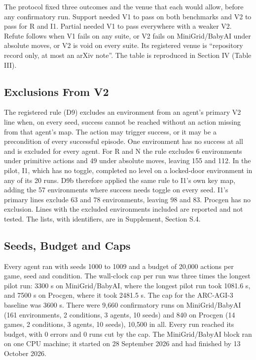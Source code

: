 \documentclass[journal]{IEEEtran}
\begin{document}
The protocol fixed three outcomes and the venue that each would allow,
before any confirmatory run. Support needed V1 to pass on both
benchmarks and V2 to pass for R and I1. Partial needed V1 to pass
everywhere with a weaker V2. Refute follows when V1 fails on any suite,
or V2 fails on MiniGrid/BabyAI under absolute moves, or V2 is void on
every suite. Its registered venue is ``repository record only, at most
an arXiv note''. The table is reproduced in Section IV (Table III).

\subsection{Exclusions From V2}\label{exclusions-from-v2}

The registered rule (D9) excludes an environment from an agent's primary
V2 line when, on every seed, success cannot be reached without an action
missing from that agent's map. The action may trigger success, or it may
be a precondition of every successful episode. One environment has no
success at all and is excluded for every agent. For R and N the rule
excludes 6 environments under primitive actions and 49 under absolute
moves, leaving 155 and 112. In the pilot, I1, which has no toggle,
completed no level on a locked-door environment in any of its 20 runs.
D9b therefore applied the same rule to I1's own key map, adding the 57
environments where success needs toggle on every seed. I1's primary
lines exclude 63 and 78 environments, leaving 98 and 83. Procgen has no
exclusion. Lines with the excluded environments included are reported
and not tested. The lists, with identifiers, are in Supplement, Section
S.4.

\subsection{Seeds, Budget and Caps}\label{seeds-budget-and-caps}

Every agent ran with seeds 1000 to 1009 and a budget of 20,000 actions
per game, seed and condition. The wall-clock cap per run was three times
the longest pilot run: 3300 s on MiniGrid/BabyAI, where the longest
pilot run took 1081.6 s, and 7500 s on Procgen, where it took 2481.5 s.
The cap for the ARC-AGI-3 baseline was 3600 s. There were 9,660
confirmatory runs on MiniGrid/BabyAI (161 environments, 2 conditions, 3
agents, 10 seeds) and 840 on Procgen (14 games, 2 conditions, 3 agents,
10 seeds), 10,500 in all. Every run reached its budget, with 0 errors
and 0 runs cut by the cap. The MiniGrid/BabyAI block ran on one CPU
machine; it started on 28 September 2026 and had finished by 13 October
2026.
\end{document}
